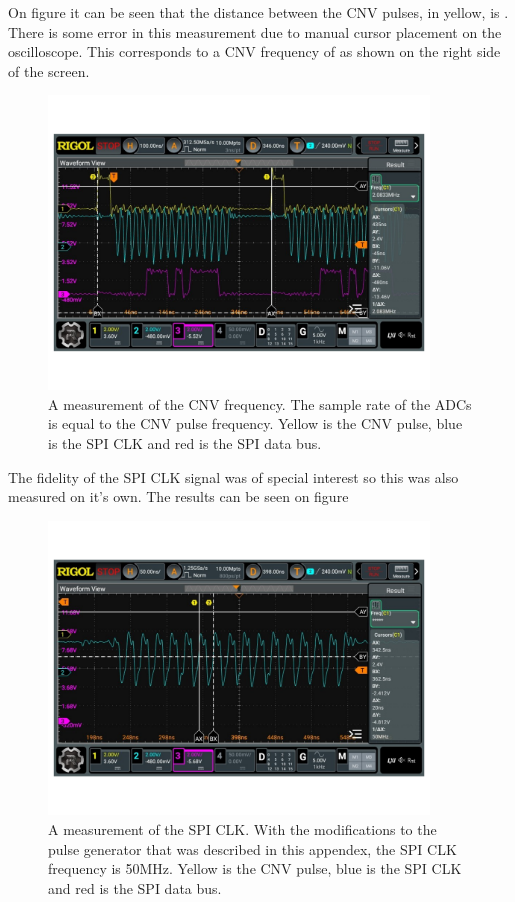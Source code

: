 On figure  it can be seen that the distance between the CNV pulses, in yellow, is . There is some error in this measurement due to manual cursor placement on the oscilloscope. This corresponds to a CNV frequency of  as shown on the right side of the screen.
\begin{figure}[H]
    \centering
    \includegraphics[clip, trim=0 75 0 50, width=0.9\textwidth]{Appendix/Figures/A_HighSpeedADCControlTestCNV.pdf}
    \caption{A measurement of the CNV frequency. The sample rate of the ADCs is equal to the CNV pulse frequency. Yellow is the CNV pulse, blue is the SPI CLK and red is the SPI data bus.}
    \label{fig:A_HighSpeedADCControlTest_CNV}
\end{figure}

The fidelity of the SPI CLK signal was of special interest so this was also measured on it's own. The results can be seen on figure 

\begin{figure}[H]
    \centering
    \includegraphics[clip, trim=0 75 0 50, width=0.9\textwidth]{Appendix/Figures/A_HighSpeedADCControlTestSPICLK.pdf}
    \caption{A measurement of the SPI CLK. With the modifications to the pulse generator that was described in this appendex, the SPI CLK frequency is 50MHz. Yellow is the CNV pulse, blue is the SPI CLK and red is the SPI data bus.}
    \label{fig:A_HighSpeedADCControlTest_SPICLK}
\end{figure}

